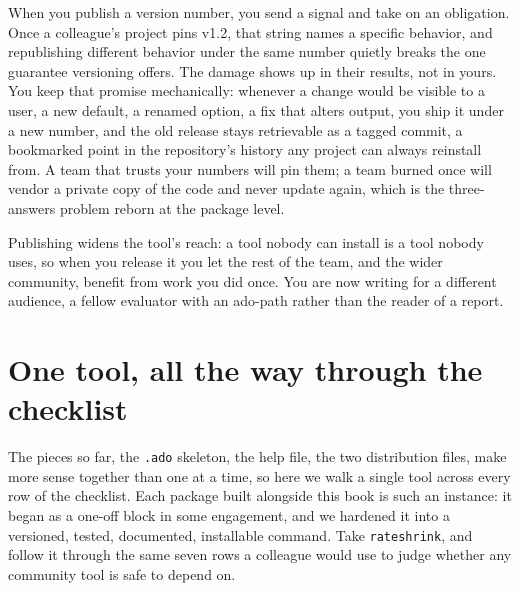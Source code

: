 When you publish a version number, you send a signal and take on an obligation. Once a colleague's project pins v1.2, that string names a specific behavior, and republishing different behavior under the same number quietly breaks the one guarantee versioning offers. The damage shows up in their results, not in yours. You keep that promise mechanically: whenever a change would be visible to a user, a new default, a renamed option, a fix that alters output, you ship it under a new number, and the old release stays retrievable as a tagged commit, a bookmarked point in the repository's history any project can always reinstall from. A team that trusts your numbers will pin them; a team burned once will vendor a private copy of the code and never update again, which is the three-answers problem reborn at the package level.

Publishing widens the tool's reach: a tool nobody can install is a tool nobody uses, so when you release it you let the rest of the team, and the wider community, benefit from work you did once. You are now writing for a different audience, a fellow evaluator with an ado-path rather than the reader of a report.

\section{One tool, all the way through the checklist}\label{sec:rateshrink-walk}
The pieces so far, the \texttt{.ado} skeleton, the help file, the two distribution files, make more sense together than one at a time, so here we walk a single tool across every row of the checklist. Each package built alongside this book is such an instance: it began as a one-off block in some engagement, and we hardened it into a versioned, tested, documented, installable command. Take \texttt{rateshrink}, and follow it through the same seven rows a colleague would use to judge whether any community tool is safe to depend on.

